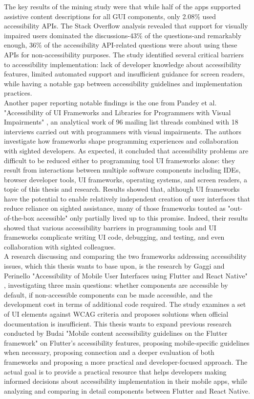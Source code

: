 The key results of the mining study were that while half of the apps supported assistive content descriptions for all GUI components, only 2.08\% used accessibility APIs. The Stack Overflow analysis revealed that support for visually impaired users dominated the discussions-43\% of the questions-and remarkably enough, 36\% of the accessibility API-related questions were about using these APIs for non-accessibility purposes.
The study identified several critical barriers to accessibility implementation: lack of developer knowledge about accessibility features, limited automated support and insufficient guidance for screen readers, while having a notable gap between accessibility guidelines and implementation practices. \\

Another paper reporting notable findings is the one from Pandey et al. "Accessibility of UI Frameworks and Libraries for Programmers with Visual Impairments" \cite{pandey2022accessibility}, an analytical work of 96 mailing list threads combined with 18 interviews carried out with programmers with visual impairments. The authors investigate how frameworks shape programming experiences and collaboration with sighted developers. As expected, it concluded that accessibility problems are difficult to be reduced either to programming tool UI frameworks alone: they result from interactions between multiple software components including IDEs, browser developer tools, UI frameworks, operating systems, and screen readers, a topic of this thesis and research. Results showed that, although UI frameworks have the potential to enable relatively independent creation of user interfaces that reduce reliance on sighted assistance, many of those frameworks touted as "out-of-the-box accessible" only partially lived up to this promise. Indeed, their results showed that various accessibility barriers in programming tools and UI frameworks complicate writing UI code, debugging, and testing, and even collaboration with sighted colleagues. \\

A research discussing and comparing the two frameworks addressing accessibility issues, which this thesis wants to base upon, is the research by Gaggi and Perinello "Accessibility of Mobile User Interfaces using Flutter and React Native" \cite{perinello2024accessibility}, investigating three main questions: whether components are accessible by default, if non-accessible components can be made accessible, and the development cost in terms of additional code required. The study examines a set of UI elements against WCAG criteria and proposes solutions when official documentation is insufficient. This thesis wants to expand previous research conducted by Budai "Mobile content accessibility guidelines on the Flutter framework" \cite{budai2024mobile} on Flutter's accessibility features, proposing mobile-specific guidelines when necessary, proposing connection and a deeper evaluation of both frameworks and proposing a more practical and developer-focused approach. The actual goal is to provide a practical resource that helps developers making informed decisions about accessibility implementation in their mobile apps, while analyzing and comparing in detail components between Flutter and React Native.  

